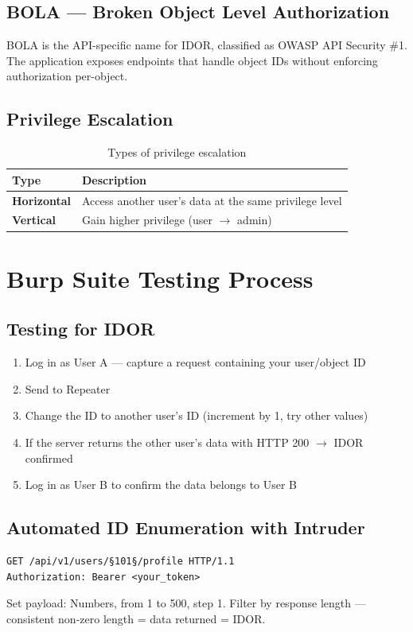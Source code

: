 \subsection{BOLA — Broken Object Level Authorization}
BOLA is the API-specific name for IDOR, classified as OWASP API Security \#1. The application exposes endpoints that handle object IDs without enforcing authorization per-object.

\subsection{Privilege Escalation}

\begin{table}[H]
\centering
\caption{Types of privilege escalation}
\begin{tabularx}{\textwidth}{>{\bfseries}lX}
\toprule
Type & Description \\
\midrule
Horizontal & Access another user's data at the same privilege level \\
Vertical & Gain higher privilege (user $\to$ admin) \\
\bottomrule
\end{tabularx}
\end{table}

\section{Burp Suite Testing Process}

\subsection{Testing for IDOR}
\begin{enumerate}
  \item Log in as User A — capture a request containing your user/object ID
  \item Send to Repeater
  \item Change the ID to another user's ID (increment by 1, try other values)
  \item If the server returns the other user's data with HTTP 200 $\to$ IDOR confirmed
  \item Log in as User B to confirm the data belongs to User B
\end{enumerate}

\subsection{Automated ID Enumeration with Intruder}
\begin{lstlisting}[style=http, caption={Intruder position for IDOR enumeration}]
GET /api/v1/users/§101§/profile HTTP/1.1
Authorization: Bearer <your_token>
\end{lstlisting}
Set payload: Numbers, from 1 to 500, step 1. Filter by response length — consistent non-zero length = data returned = IDOR.

